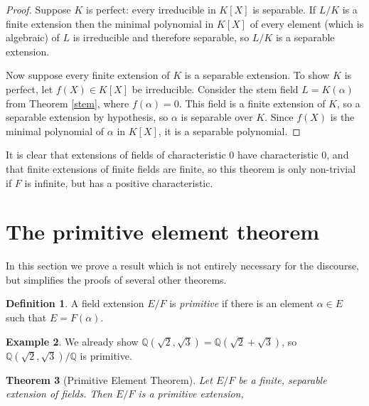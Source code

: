 \documentclass[12pt]{report}
\newtheorem{thm}{Theorem}[section]
\theoremstyle{definition}
\newtheorem{defn}[thm]{Definition}
\newtheorem{example}[thm]{Example}
\def\QQ{\mathbb{Q}}
\def\aa{\alpha}
\begin{document}
\begin{proof}
    Suppose $K$ is perfect: every irreducible in $K[X]$ is separable. If $L/K$ is a finite extension then the minimal polynomial in $K[X]$ of every element (which is algebraic) of $L$ is irreducible and therefore separable, so $L/K$ is a separable extension.

    Now suppose every finite extension of $K$ is a separable extension. To show $K$ is perfect, let $f(X) \in K[X]$ be irreducible. Consider the stem field $L = K(\aa)$ from Theorem \ref{stem}, where $f(\aa) = 0$. This field is a finite extension of $K$, so a separable extension by hypothesis, so $\aa$ is separable over $K$. Since $f(X)$ is the minimal polynomial of $\aa$ in $K[X]$, it is a separable polynomial.
\end{proof}

It is clear that extensions of fields of characteristic 0 have characteristic 0, and that finite extensions of finite fields are finite, so this theorem is only non-trivial if $F$ is infinite, but has a positive characteristic.

\section{The primitive element theorem}

In this section we prove a result which is not entirely necessary for the discourse, but simplifies the proofs of several other theorems.

\begin{defn}
    A field extension $E/F$ is \emph{primitive} if there is an element $\aa\in E$ such that $E=F(\aa)$.
\end{defn}

\begin{example}
    We already show $\QQ(\sqrt{2},\sqrt{3})=\QQ(\sqrt{2}+\sqrt{3})$, so $\QQ(\sqrt{2},\sqrt{3})/\QQ$ is primitive.
\end{example}

\begin{thm}[Primitive Element Theorem]\label{primitive}
    Let $E/F$ be a finite, separable extension of fields. Then $E/F$ is a primitive extension,
\end{thm}
\end{document}
